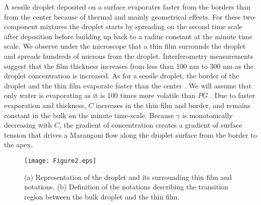 \documentclass[aps,prl,reprint,superscriptaddress,amsmath,amssymb,]{revtex4-1}
\begin{document}
A sessile droplet deposited on a surface evaporates faster from the borders than from the center because of thermal \cite{ristenpart2007influence, xu2009criterion} and mainly geometrical \cite{hu2002evaporation, eggers2010nonlocal} effects. For these two-component mixtures the droplet starts by spreading on the second time scale after deposition before building up back to a radius constant at the minute time scale. We observe under the microscope that a thin film surrounds the droplet and spreads hundreds of microns from the droplet. Interferometry measurements suggest that the film thickness increases from less than 100 nm to 300 nm as the droplet concentration is increased. As for a sessile droplet, the border of the droplet and the thin film evaporate faster than the center \cite{deegan1997capillary}. We will assume that only water is evaporating as it is 100 times more volatile than $PG$ \cite{curme1952glycols}. Due to faster evaporation and thickness, $C$ increases in the thin film and border, and remains constant in the bulk on the minute time-scale. Because $\gamma$ is monotonically decreasing with $C$, the gradient of concentration creates a gradient of surface tension that drives a Marangoni flow along the droplet surface from the border to the apex. 

\begin{figure}
\texttt{[image: Figure2.eps]}
\caption{(a) Representation of the droplet and its surrounding thin film and notations. (b) Definition of the notations describing the transition region between the bulk droplet and the thin film.}
\label{figure2}
\end{figure}
\end{document}
